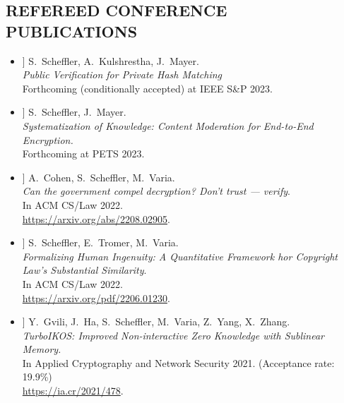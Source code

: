 \documentclass{res}
\begin{document}
\begin{resume}
\section{REFEREED CONFERENCE PUBLICATIONS}
\vspace{0.25in}

\newcommand{\csamimprovements}{[1]\xspace}
\newcommand{\eeesok}{[2]\xspace}
\newcommand{\foregoneVerif}{[3]\xspace}
\newcommand{\copyrightMDL}{[4]\xspace}
\newcommand{\turboikos}{[5]\xspace}
\newcommand{\booligero}{[6]\xspace}
\newcommand{\foregoneconclusion}{[7]\xspace}
\newcommand{\AEC}{[8]\xspace}
\newcommand{\devicefingerprinting}{[9]\xspace}
\newcommand{\pullingblocks}{[10]\xspace}
\newcommand{\fairsibility}{[11]\xspace}
\newcommand{\emailspam}{[12]\xspace}

\begin{itemize}
\item[\csamimprovements] S.~Scheffler, A.~Kulshrestha, J.~Mayer. \\
\emph{Public Verification for Private Hash Matching} \\
Forthcoming (conditionally accepted) at IEEE S\&P 2023.

\item[\eeesok] S.~Scheffler, J.~Mayer. \\
\emph{Systematization of Knowledge: Content Moderation for End-to-End Encryption.} \\
Forthcoming at PETS 2023.

\item[\foregoneVerif] A.~Cohen, S.~Scheffler, M.~Varia. \\
\emph{Can the government compel decryption?  Don't trust --- verify}. \\
In ACM CS/Law 2022. \\
\url{https://arxiv.org/abs/2208.02905}.

\item[\copyrightMDL] S.~Scheffler, E.~Tromer, M.~Varia. \\
\emph{Formalizing Human Ingenuity: A Quantitative Framework hor Copyright Law's Substantial Similarity}. \\
In ACM CS/Law 2022. \\
\url{https://arxiv.org/pdf/2206.01230}.

\item[\turboikos] Y.~Gvili, J.~Ha, S.~Scheffler, M.~Varia, Z.~Yang, X.~Zhang. \\
\emph{TurboIKOS: Improved Non-interactive Zero Knowledge with Sublinear Memory.} \\
In Applied Cryptography and Network Security 2021. (Acceptance rate: 19.9\%) \\
\url{https://ia.cr/2021/478}.


\end{itemize}
\end{resume}
\end{document}
